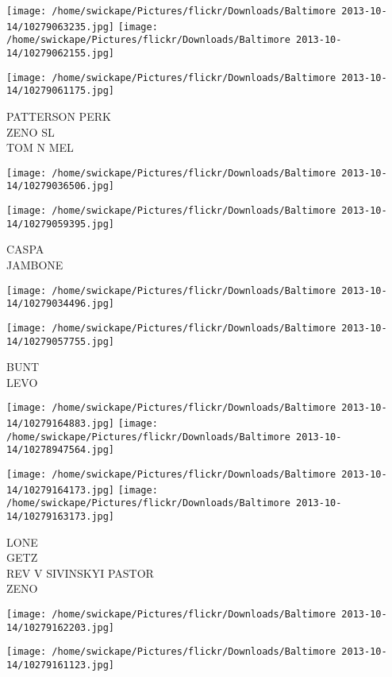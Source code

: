 \documentclass[10pt,letterpaper]{article}
\begin{document}
\texttt{[image: /home/swickape/Pictures/flickr/Downloads/Baltimore 2013-10-14/10279063235.jpg]}
\texttt{[image: /home/swickape/Pictures/flickr/Downloads/Baltimore 2013-10-14/10279062155.jpg]}

\vspace{0.25in}
\texttt{[image: /home/swickape/Pictures/flickr/Downloads/Baltimore 2013-10-14/10279061175.jpg]}

PATTERSON PERK\\
ZENO SL\\
TOM N MEL
\pagebreak

\texttt{[image: /home/swickape/Pictures/flickr/Downloads/Baltimore 2013-10-14/10279036506.jpg]}

\vspace{0.25in}
\texttt{[image: /home/swickape/Pictures/flickr/Downloads/Baltimore 2013-10-14/10279059395.jpg]}

CASPA\\
JAMBONE
\pagebreak

\texttt{[image: /home/swickape/Pictures/flickr/Downloads/Baltimore 2013-10-14/10279034496.jpg]}

\vspace{0.25in}
\texttt{[image: /home/swickape/Pictures/flickr/Downloads/Baltimore 2013-10-14/10279057755.jpg]}

BUNT\\
LEVO
\pagebreak

\texttt{[image: /home/swickape/Pictures/flickr/Downloads/Baltimore 2013-10-14/10279164883.jpg]}
\texttt{[image: /home/swickape/Pictures/flickr/Downloads/Baltimore 2013-10-14/10278947564.jpg]}

\texttt{[image: /home/swickape/Pictures/flickr/Downloads/Baltimore 2013-10-14/10279164173.jpg]}
\texttt{[image: /home/swickape/Pictures/flickr/Downloads/Baltimore 2013-10-14/10279163173.jpg]}

LONE\\
GETZ\\
REV V SIVINSKYI PASTOR\\
ZENO
\pagebreak

\texttt{[image: /home/swickape/Pictures/flickr/Downloads/Baltimore 2013-10-14/10279162203.jpg]}

\vspace{0.25in}
\texttt{[image: /home/swickape/Pictures/flickr/Downloads/Baltimore 2013-10-14/10279161123.jpg]}
\end{document}
